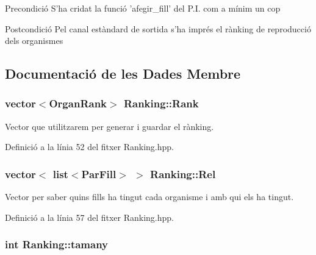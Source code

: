 \begin{DoxyPrecond}{Precondició}
S'ha cridat la funció 'afegir\-\_\-fill' del P.\-I. com a mínim un cop 
\end{DoxyPrecond}
\begin{DoxyPostcond}{Postcondició}
Pel canal estàndard de sortida s'ha imprés el rànking de reproducció dels organismes 
\end{DoxyPostcond}


\subsection{Documentació de les Dades Membre}
\hypertarget{class_ranking_a23ba29c13cb5ac32d3fc97252f20afde}{
\subsubsection[{Rank}]{\setlength{\rightskip}{0pt plus 5cm}vector$<${\bf Organ\-Rank}$>$ Ranking\-::\-Rank\hspace{0.3cm}{\ttfamily [private]}}}\label{class_ranking_a23ba29c13cb5ac32d3fc97252f20afde}


Vector que utilitzarem per generar i guardar el rànking. 



Definició a la línia 52 del fitxer Ranking.\-hpp.

\hypertarget{class_ranking_a714b5b8881dccd99dad7e58b81ce7769}{
\subsubsection[{Rel}]{\setlength{\rightskip}{0pt plus 5cm}vector$<$ list$<${\bf Par\-Fill}$>$ $>$ Ranking\-::\-Rel\hspace{0.3cm}{\ttfamily [private]}}}\label{class_ranking_a714b5b8881dccd99dad7e58b81ce7769}


Vector per saber quins fills ha tingut cada organisme i amb qui els ha tingut. 



Definició a la línia 57 del fitxer Ranking.\-hpp.

\hypertarget{class_ranking_a3001b3854a474fc12c0fc31e0baea946}{
\subsubsection[{tamany}]{\setlength{\rightskip}{0pt plus 5cm}int Ranking\-::tamany\hspace{0.3cm}{\ttfamily [private]}}}\label{class_ranking_a3001b3854a474fc12c0fc31e0baea946}


